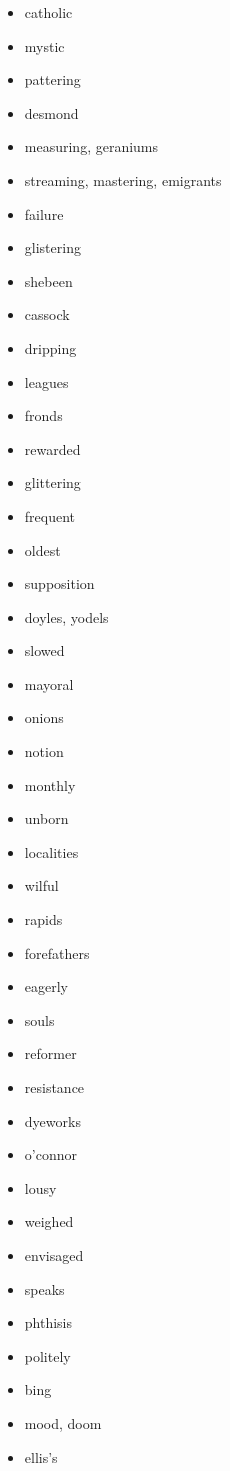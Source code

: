 \documentclass{article}
\begin{document}
\begin{itemize}
    \item catholic
    \item mystic
    \item pattering
    \item desmond
    \item measuring, geraniums
    \item streaming, mastering, emigrants
    \item failure
    \item glistering
    \item shebeen
    \item cassock
    \item dripping
    \item leagues
    \item fronds
    \item rewarded
    \item glittering
    \item frequent
    \item oldest
    \item supposition
    \item doyles, yodels
    \item slowed
    \item mayoral
    \item onions
    \item notion
    \item monthly
    \item unborn
    \item localities
    \item wilful
    \item rapids
    \item forefathers
    \item eagerly
    \item souls
    \item reformer
    \item resistance
    \item dyeworks
    \item o'connor
    \item lousy
    \item weighed
    \item envisaged
    \item speaks
    \item phthisis
    \item politely
    \item bing
    \item mood, doom
    \item ellis's

\end{itemize}
\end{document}
